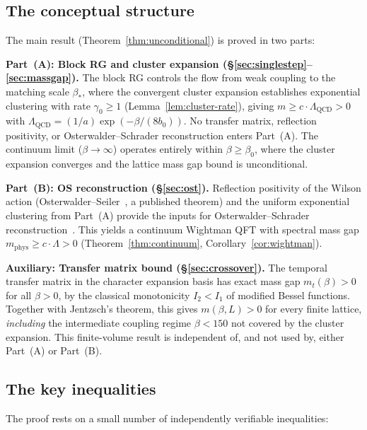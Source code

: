 \documentclass[11pt]{article}
\theoremstyle{definition}
\newcommand{\Lam}{\Lambda_{\mathrm{QCD}}}
\begin{document}
\subsection{The conceptual structure}

The main result (Theorem~\ref{thm:unconditional}) is proved in two
parts:

\medskip\noindent\textbf{Part~(A): Block RG and cluster expansion
(\S\ref{sec:singlestep}--\ref{sec:massgap}).}
The block RG controls the flow from weak coupling
to the matching scale $\beta_*$, where the convergent cluster
expansion establishes exponential
clustering with rate $\gamma_0\ge 1$ (Lemma~\ref{lem:cluster-rate}),
giving
$m\ge c\cdot\Lam>0$ with $\Lam=(1/a)\exp(-\beta/(8b_0))$.
No transfer matrix, reflection positivity, or
Osterwalder--Schrader reconstruction enters Part~(A).
The continuum limit ($\beta\to\infty$) operates entirely
within $\beta\ge\beta_0$, where the cluster expansion converges
and the lattice mass gap bound is unconditional.

\medskip\noindent\textbf{Part~(B): OS reconstruction
(\S\ref{sec:ost}).}
Reflection positivity of the Wilson action
(Osterwalder--Seiler~\cite{OS78}, a published theorem) and the
uniform exponential clustering from Part~(A) provide the
inputs for Osterwalder--Schrader reconstruction~\cite{OS73}.
This yields a continuum Wightman QFT with spectral mass gap
$m_{\mathrm{phys}}\ge c\cdot\Lambda>0$
(Theorem~\ref{thm:continuum}, Corollary~\ref{cor:wightman}).

\medskip\noindent\textbf{Auxiliary: Transfer matrix bound
(\S\ref{sec:crossover}).}
The temporal transfer matrix in the character expansion basis has
exact mass gap $m_t(\beta)>0$ for all
$\beta>0$, by the classical monotonicity $I_2<I_1$ of modified
Bessel functions.  Together with Jentzsch's theorem, this gives
$m(\beta,L)>0$ for every finite lattice,
\emph{including} the intermediate coupling
regime $\beta<150$ not covered by the cluster expansion.
This finite-volume result is independent of, and not
used by, either Part~(A) or Part~(B).

\subsection{The key inequalities}

The proof rests on a small number of independently verifiable
inequalities:
\end{document}
